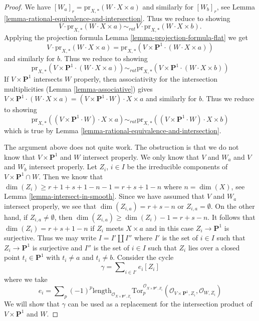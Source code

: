 \begin{proof}
We have $[W_a]_r = \text{pr}_{X,*}(W \cdot X \times a)$ and similarly for
$[W_b]_r$, see Lemma \ref{lemma-rational-equivalence-and-intersection}.
Thus we reduce to showing
$$
V \cdot \text{pr}_{X,*}( W \cdot X \times a) \sim_{rat} V \cdot
\text{pr}_{X,*}( W \cdot X\times b).
$$
Applying the projection formula
Lemma \ref{lemma-projection-formula-flat} we get
$$
V \cdot \text{pr}_{X,*}( W \cdot X\times a) =
\text{pr}_{X,*}(V \times \mathbf{P}^1 \cdot (W \cdot X\times a))
$$
and similarly for $b$. Thus we reduce to showing
$$
\text{pr}_{X,*}(V \times \mathbf{P}^1 \cdot (W \cdot X\times a))
\sim_{rat}
\text{pr}_{X,*}(V \times \mathbf{P}^1 \cdot (W \cdot X\times b))
$$
If $V \times \mathbf{P}^1$ intersects $W$ properly, then
associativity for the intersection multiplicities
(Lemma \ref{lemma-associative})
gives $V \times \mathbf{P}^1 \cdot (W \cdot X\times a) =
(V \times \mathbf{P}^1 \cdot W) \cdot X \times a$
and similarly for $b$.  Thus we reduce to showing
$$
\text{pr}_{X,*}((V \times \mathbf{P}^1 \cdot W) \cdot X\times a)
\sim_{rat}
\text{pr}_{X,*}((V \times \mathbf{P}^1 \cdot W) \cdot X\times b)
$$
which is true by Lemma \ref{lemma-rational-equivalence-and-intersection}.

\medskip\noindent
The argument above does not quite work. The obstruction is that
we do not know that $V \times \mathbf{P}^1$ and $W$ intersect properly.
We only know that $V$ and $W_a$ and $V$ and $W_b$ intersect properly.
Let $Z_i$, $i \in I$ be the irreducible components of
$V \times \mathbf{P}^1 \cap W$. Then we know that
$\dim(Z_i) \geq r + 1 + s + 1 - n - 1 = r + s + 1 - n$ where $n = \dim(X)$, see
Lemma \ref{lemma-intersect-in-smooth}. Since we have assumed
that $V$ and $W_a$ intersect properly, we see that
$\dim(Z_{i, a}) = r + s - n$ or $Z_{i, a} = \emptyset$.
On the other hand, if $Z_{i, a} \not = \emptyset$, then
$\dim(Z_{i, a}) \geq \dim(Z_i) - 1 = r + s - n$.
It follows that $\dim(Z_i) = r + s + 1 - n$ if $Z_i$ meets $X \times a$
and in this case $Z_i \to \mathbf{P}^1$ is surjective.
Thus we may write $I = I' \amalg I''$ where $I'$ is the set of $i \in I$
such that $Z_i \to \mathbf{P}^1$ is surjective and $I''$ is the set of
$i \in I$ such that $Z_i$ lies over a closed point $t_i \in \mathbf{P}^1$
with $t_i \not = a$ and $t_i \not = b$. Consider the cycle
$$
\gamma = \sum\nolimits_{i \in I'} e_i [Z_i]
$$
where we take
$$
e_i = \sum\nolimits_p (-1)^p
\text{length}_{\mathcal{O}_{X \times \mathbf{P}^1, Z_i}}
\text{Tor}_p^{\mathcal{O}_{X \times \mathbf{P}^1, Z_i}}(
\mathcal{O}_{V \times \mathbf{P}^1, Z_i}, \mathcal{O}_{W, Z_i})
$$
We will show that $\gamma$ can be used as a replacement for
the intersection product of $V \times \mathbf{P}^1$ and $W$.


\end{proof}
